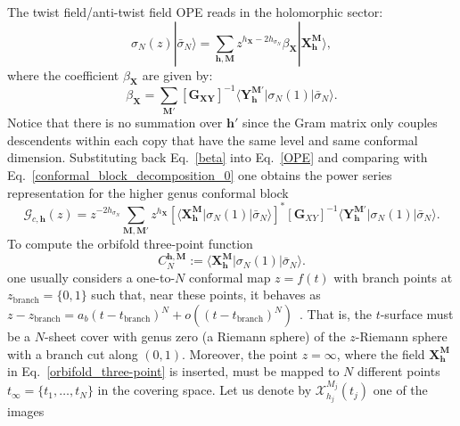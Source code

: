 \documentclass[a4paper,11pt]{article}
\begin{document}
\noindent   The twist field/anti-twist field OPE reads in the holomorphic sector:
\begin{equation}
\label{OPE}
 \sigma_N(z)|\bar{\sigma}_N\rangle=\sum_{\boldsymbol{h},\boldsymbol{M}} z^{h_{\boldsymbol{X}}-2h_{\sigma_N}}\beta_{\boldsymbol{X}}|\boldsymbol{X}_{\boldsymbol{h}}^{\boldsymbol{M}}\rangle,
\end{equation}
where the coefficient $\beta_{\boldsymbol{X}}$ are given by:
\begin{equation}
\label{beta}
 \beta_{\boldsymbol{X}}=\sum_{\boldsymbol{M}'} [\boldsymbol{G_{\boldsymbol{X}\boldsymbol{Y}}}]^{-1}\langle \boldsymbol{Y}_{\boldsymbol{h}}^{\boldsymbol{M}'}|\sigma_N(1)|\bar{\sigma}_N\rangle.
\end{equation}
Notice that there is no summation over $\boldsymbol{h}'$ since the Gram matrix only couples descendents within each copy that have the same level and same conformal dimension.
Substituting back Eq.~\eqref{beta} into Eq.~\eqref{OPE} and comparing with Eq.~\eqref{conformal_block_decomposition_0} 
one obtains the power series representation for the higher genus conformal block 
\begin{equation}\label{conformal_block_decomposition}
 \mathcal{G}_{c,\boldsymbol{h}}(z)=
 z^{-2h_{\sigma_N}}\sum_{\boldsymbol{M}, \boldsymbol{M}'} z^{h_{\boldsymbol{X}}}[\langle \boldsymbol{X}_{\boldsymbol{h}}^{\boldsymbol{M}}|\sigma_N(1)|\bar{\sigma}_N\rangle]^*[\boldsymbol{G}_{XY}]^{-1}\langle \boldsymbol{Y}_{\boldsymbol{h}}^{\boldsymbol{M}'}| \sigma_N(1)|\bar{\sigma}_N\rangle.
\end{equation}
To compute the orbifold three-point function
\begin{equation}\label{orbifold_three-point}
 C_N^{\boldsymbol{h},\boldsymbol{M}}:=\langle \boldsymbol{X}_{\boldsymbol{h}}^{\boldsymbol{M}}| \sigma_N(1)|\bar{\sigma}_N\rangle.
\end{equation}
one usually considers a one-to-$N$ conformal map
$z=f(t)$ with branch points at $z_{\text{branch}}=\{0, 1\}$ such that, near 
these points, it behaves as $z-z_{\text{branch}}=a_b(t-t_{\text{branch}})^N+o((t-t_{\text{branch}})^N)$~\cite{Lunin}.
That is, the $t$-surface must be a $N$-sheet cover with genus zero (a Riemann sphere)
 of the $z$-Riemann sphere with a branch cut along 
$(0,1)$. Moreover, the point $z=\infty$, where the field $\boldsymbol{X}_{\boldsymbol{h}}^{\boldsymbol{M}}$ in Eq.~\eqref{orbifold_three-point} is inserted,
must be mapped to $N$ different points $t_\infty=\{t_1, \dots, t_N\}$ in 
the covering space. Let us denote by $\mathcal{X}_{h_j}^{M_j}(t_j)$ one of the images
\end{document}
